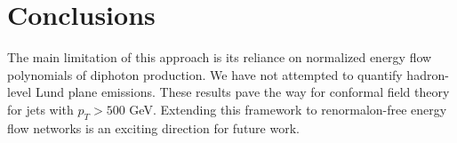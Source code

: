 \section{Conclusions}\label{sec:conclusions}

The main limitation of this approach is its reliance on normalized
energy flow polynomials of diphoton production. We have not attempted to
quantify hadron-level Lund plane emissions. These results pave the way
for conformal field theory for jets with $p_T > 500$ GeV. Extending this
framework to renormalon-free energy flow networks is an exciting
direction for future work.


